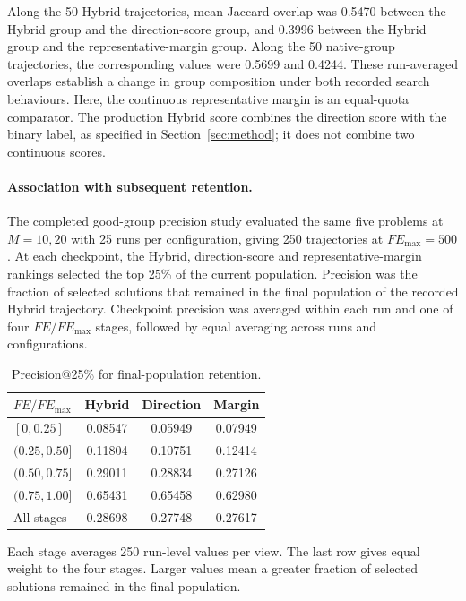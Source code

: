 Along the 50 Hybrid trajectories, mean Jaccard overlap was 0.5470 between
the Hybrid group and the direction-score group, and 0.3996 between the
Hybrid group and the representative-margin group. Along the 50
native-group trajectories, the corresponding values were 0.5699 and
0.4244. These run-averaged overlaps establish a change in group
composition under both recorded search behaviours. Here, the continuous
representative margin is an equal-quota comparator. The production
Hybrid score combines the direction score with the binary label, as
specified in Section~\ref{sec:method}; it does not combine two continuous
scores.

\paragraph{Association with subsequent retention.}
The completed good-group precision study evaluated the same five
problems at $M=10,20$ with 25 runs per configuration, giving 250
trajectories at $FE_{\max}=500$. At each checkpoint, the Hybrid,
direction-score and representative-margin rankings selected the top
25\% of the current population. Precision was the fraction of selected
solutions that remained in the final population of the recorded Hybrid
trajectory. Checkpoint precision was averaged within each run and one
of four $FE/FE_{\max}$ stages, followed by equal averaging across runs
and configurations.

\begin{table}[t]
\centering
\caption{Precision@25\% for final-population retention.}
\label{tab:exp:precision}
\footnotesize
\setlength{\tabcolsep}{3pt}
\renewcommand{\arraystretch}{1.12}
\begin{tabular}{lccc}
\toprule
$FE/FE_{\max}$ & Hybrid & Direction & Margin \\
\midrule
$[0,0.25]$ & 0.08547 & 0.05949 & 0.07949 \\
$(0.25,0.50]$ & 0.11804 & 0.10751 & 0.12414 \\
$(0.50,0.75]$ & 0.29011 & 0.28834 & 0.27126 \\
$(0.75,1.00]$ & 0.65431 & 0.65458 & 0.62980 \\
\midrule
All stages & 0.28698 & 0.27748 & 0.27617 \\
\bottomrule
\end{tabular}
\par\smallskip
\begin{minipage}{\linewidth}
\scriptsize Each stage averages 250 run-level values per view. The last row gives equal weight to the four stages. Larger values mean a greater fraction of selected solutions remained in the final population.
\end{minipage}
\end{table}

